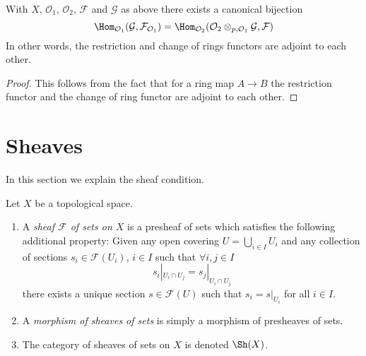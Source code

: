\begin{lemma}
\label{lemma-adjointness-tensor-restrict-presheaves}
With $X$, $\mathcal{O}_1$, $\mathcal{O}_2$, $\mathcal{F}$ and
$\mathcal{G}$ as above there exists a canonical bijection
$$
\Hom_{\mathcal{O}_1}(\mathcal{G}, \mathcal{F}_{\mathcal{O}_1})
=
\Hom_{\mathcal{O}_2}(
\mathcal{O}_2 \otimes_{p, \mathcal{O}_1} \mathcal{G},
\mathcal{F}
)
$$
In other words, the restriction and change of rings functors
are adjoint to each other.
\end{lemma}

\begin{proof}
This follows from the fact that for a ring map
$A \to B$ the restriction functor and the change
of ring functor are adjoint to each other.
\end{proof}





\section{Sheaves}
\label{section-sheaves}

\noindent
In this section we explain the sheaf condition.

\begin{definition}
\label{definition-sheaf}
Let $X$ be a topological space.
\begin{enumerate}
\item A {\it sheaf $\mathcal{F}$ of sets on $X$} is a presheaf
of sets which satisfies the following additional property: Given
any open covering $U = \bigcup_{i \in I} U_i$ and any collection
of sections $s_i \in \mathcal{F}(U_i)$, $i \in I$ such that
$\forall i, j\in I$
$$
s_i|_{U_i \cap U_j} = s_j|_{U_i \cap U_j}
$$
there exists a unique section $s \in \mathcal{F}(U)$ such that
$s_i = s|_{U_i}$ for all $i \in I$.
\item A {\it morphism of sheaves of sets} is simply a
morphism of presheaves of sets.
\item The category of sheaves of sets on $X$ is denoted
$\Sh(X)$.
\end{enumerate}
\end{definition}

